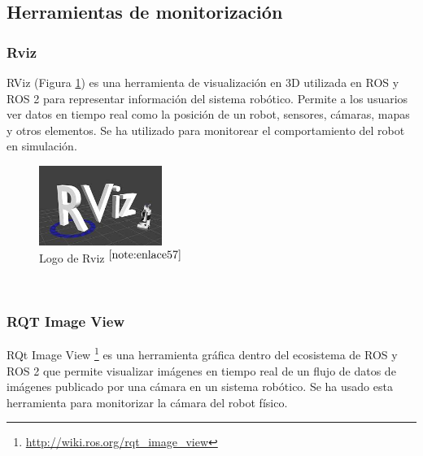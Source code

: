 \setcounter{footnote}{56} %

\subsection{Herramientas de monitorización}

\subsubsection{Rviz}

RViz (Figura \ref{fig:rviz}) es una herramienta de visualización en 3D utilizada en \acs{ROS} y \acs{ROS} 2 para representar información del sistema robótico. Permite a los usuarios ver datos en tiempo real como la posición de un robot, sensores, cámaras, mapas y otros elementos. Se ha utilizado para monitorear el comportamiento del robot en simulación.\\

\begin{figure} [h!]
	\begin{center}
		\includegraphics[width=4cm]{figs/rviz.png}
	\end{center}
	\caption{Logo de Rviz $^{\ref{note:enlace57}}$} 
	\label{fig:rviz}
\end{figure}\

\setcounter{footnote}{57} %

\subsubsection{RQT Image View}

RQt Image View \footnote{\url{http://wiki.ros.org/rqt_image_view}} es una herramienta gráfica dentro del ecosistema de \acs{ROS} y \acs{ROS} 2 que permite visualizar imágenes en tiempo real de un flujo de datos de imágenes publicado por una cámara en un sistema robótico. Se ha usado esta herramienta para monitorizar la cámara del robot físico.

